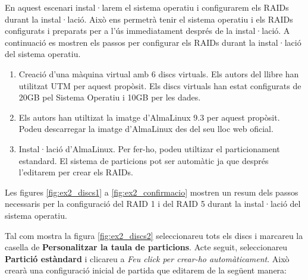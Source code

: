 En aquest escenari instal·larem el sistema operatiu i configurarem els RAIDs durant la instal·lació. Això ens permetrà tenir el sistema operatiu i els RAIDs configurats i preparats per a l'ús immediatament després de la instal·lació. A continuació es mostren els passos per configurar els RAIDs durant la instal·lació del sistema operatiu. 

\begin{enumerate}
        \item Creació d'una màquina virtual amb 6 discs virtuals. Els autors del llibre han utilitzat UTM per aquest propòsit. Els discs virtuals han estat configurats de 20GB pel Sistema Operatiu i 10GB per les dades.
        \item Els autors han utiltizat la imatge d'AlmaLinux 9.3 per aquest propòsit. Podeu descarregar la imatge d'AlmaLinux des del seu lloc web oficial.
        \item Instal·lació d'AlmaLinux. Per fer-ho, podeu utiltizar el particionament estandard. %
El sistema de particions pot ser automàtic ja que després l'editarem per crear els RAIDs.
\end{enumerate}

Les figures \ref{fig:ex2_discs1} a \ref{fig:ex2_confirmacio} mostren un resum dels passos necessaris per la configuració del RAID 1 i del RAID 5 durant la instal·lació del sistema operatiu. %

Tal com mostra la figura \ref{fig:ex2_discs2} seleccionareu tots els discs i marcareu la casella de \textbf{Personalitzar la taula de particions}. Acte seguit, seleccionareu \textbf{Partició estàndard} i clicareu a \textit{Feu click per crear-ho automàticament}. Això crearà una configuració inicial de partida que editarem de la següent manera:

